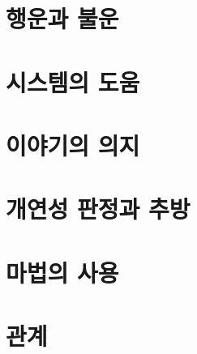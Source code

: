 \documentclass{report}
\begin{document}
	\section{행운과 불운}
		
	
	\section{시스템의 도움}
		
	
	\section{이야기의 의지}
		
	
	\section{개연성 판정과 추방}
		
	
	\section{마법의 사용}
		
	
	\section{관계}
		
	
\end{document}
